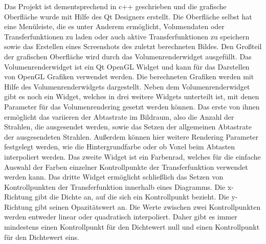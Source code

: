 Das Projekt ist dementsprechend in c++ geschrieben und die grafische Oberfläche wurde mit Hilfe des Qt Designers erstellt.
Die Oberfläche selbst hat eine Menüleiste, die es unter Anderem ermöglicht, Volumendaten oder Transferfunktionen zu laden oder auch aktive Transferfunktionen zu speichern sowie das Erstellen eines Screenshots des zuletzt berechneten Bildes.
Den Großteil der grafischen Oberfläche wird durch das Volumenrenderwidget ausgefüllt.
Das Volumenrenderwidget ist ein Qt OpenGL Widget und kann für das Darstellen von OpenGL Grafiken verwendet werden.
Die berechneten Grafiken werden mit Hilfe des Volumenrenderwidgets dargestellt.
Neben dem Volumenrenderwidget gibt es noch ein Widget, welches in drei weitere Widgets unterteilt ist, mit denen Parameter für das Volumenrendering gesetzt werden können.
Das erste von ihnen ermöglicht das variieren der Abtastrate im Bildraum, also die Anzahl der Strahlen, die ausgesendet werden, sowie das Setzen der allgemeinen Abtastrate der ausgesendeten Strahlen.
Außerdem können hier weitere Rendering Parameter festgelegt werden, wie die Hintergrundfarbe oder ob Voxel beim Abtasten interpoliert werden.
Das zweite Widget ist ein Farbenrad, welches für die einfache Auswahl der Farben einzelner Kontrollpunkte der Transferfunktion verwendet werden kann.
Das dritte Widget ermöglicht schließlich das Setzen von Kontrollpunkten der Transferfunktion innerhalb eines Diagramms.
Die x-Richtung gibt die Dichte an, auf die sich ein Kontrollpunkt bezieht.
Die y-Richtung gibt seinen Opazitätswert an.
Die Werte zwischen zwei Kontrollpunkten werden entweder linear oder quadratisch interpoliert.
Daher gibt es immer mindestens einen Kontrollpunkt für den Dichtewert null und einen Kontrollpunkt für den Dichtewert eins.

